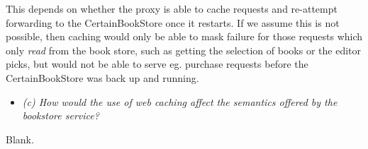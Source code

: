 \noindent This depends on whether the proxy is able to cache requests and re-attempt
forwarding to the CertainBookStore once it restarts. If we assume this is not
possible, then caching would only be able to mask failure for those requests
which only \textit{read} from the book store, such as getting the selection of
books or the editor picks, but would not be able to serve eg. purchase requests
before the CertainBookStore was back up and running.

\begin{itemize}
  \item \textit{(c) How would the use of web caching affect the semantics offered by
  the bookstore service?}
\end{itemize}

\noindent Blank.

\tykstreg

